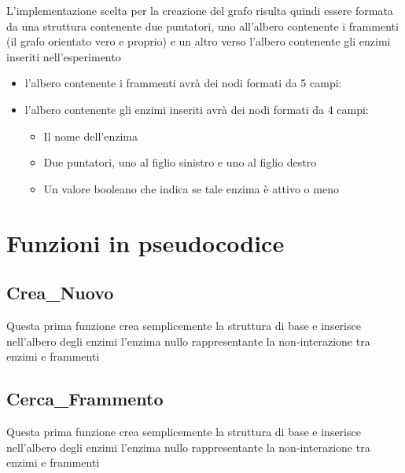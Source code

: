 \documentclass[a4paper,10pt]{article}
\begin{document}
L'implementazione scelta per la creazione del grafo risulta quindi essere formata da una struttura contenente due puntatori, uno all'albero contenente i frammenti (il grafo orientato vero e proprio) e un altro verso l'albero contenente gli enzimi inseriti nell'esperimento 
\begin{itemize}
\item l'albero contenente i frammenti avrà dei nodi formati da 5 campi: 
\item l'albero contenente gli enzimi inseriti avrà dei nodi formati da 4 campi:
\begin{itemize}
\item Il nome dell'enzima
\item Due puntatori, uno al figlio sinistro e uno al figlio destro
\item Un valore booleano che indica se tale enzima è attivo o meno
\end{itemize}
\end{itemize}

\section{Funzioni in pseudocodice}
\subsection{Crea\_{}Nuovo}
Questa prima funzione crea semplicemente la struttura di base e inserisce nell'albero degli enzimi l'enzima nullo rappresentante la non-interazione tra enzimi e frammenti
\begin{algorithm}[H]
\end{algorithm}
\subsection{Cerca\_{}Frammento}
Questa prima funzione crea semplicemente la struttura di base e inserisce nell'albero degli enzimi l'enzima nullo rappresentante la non-interazione tra enzimi e frammenti
\begin{algorithm}[H]
\end{algorithm}
\end{document}
